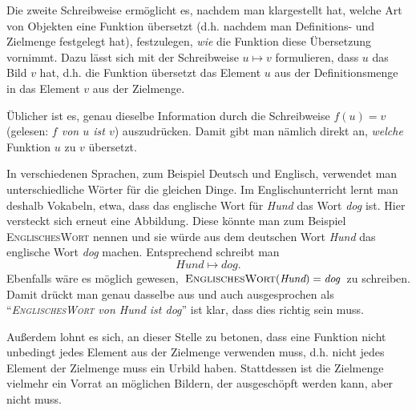 \documentclass[../../main.tex]{subfiles}
\begin{document}
Die zweite Schreibweise ermöglicht es, nachdem man klargestellt hat, welche Art von Objekten eine Funktion übersetzt (d.h. nachdem man Definitions- und Zielmenge festgelegt hat), festzulegen, \emph{wie} die Funktion diese Übersetzung vornimmt. Dazu lässt sich mit der Schreibweise $u\mapsto v$ formulieren, dass $u$ das Bild $v$ hat, d.h. die Funktion übersetzt das Element $u$ aus der Definitionsmenge in das Element $v$ aus der Zielmenge.

Üblicher ist es, genau dieselbe Information durch die Schreibweise $f(u)=v$ (gelesen: \emph{$f$ von $u$ ist $v$}) auszudrücken. Damit gibt man nämlich direkt an, \emph{welche} Funktion $u$ zu $v$ übersetzt.

\begin{example}{}
    In verschiedenen Sprachen, zum Beispiel Deutsch und Englisch, verwendet man unterschiedliche Wörter für die gleichen Dinge. Im Englischunterricht lernt man deshalb Vokabeln, etwa, dass das englische Wort für \emph{Hund} das Wort \emph{dog} ist. Hier versteckt sich erneut eine Abbildung. Diese könnte man zum Beispiel \textsc{EnglischesWort} nennen und sie würde aus dem deutschen Wort \emph{Hund} das englische Wort \emph{dog} machen. Entsprechend schreibt man
    \[\textit{Hund}\mapsto\textit{dog}.\]
    Ebenfalls wäre es möglich gewesen, $\textsc{EnglischesWort}(\textit{Hund})=\textit{dog}$ zu schreiben. Damit drückt man genau dasselbe aus und auch ausgesprochen als \enquote{\emph{\textsc{EnglischesWort} von Hund ist dog}} ist klar, dass dies richtig sein muss.
\end{example}

Außerdem lohnt es sich, an dieser Stelle zu betonen, dass eine Funktion nicht unbedingt jedes Element aus der Zielmenge verwenden muss, d.h. nicht jedes Element der Zielmenge muss ein Urbild haben. Stattdessen ist die Zielmenge vielmehr ein Vorrat an möglichen Bildern, der ausgeschöpft werden kann, aber nicht muss.
\end{document}
